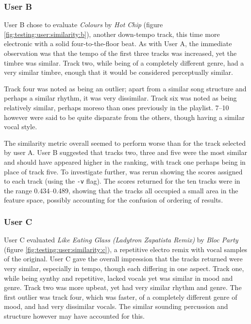 \subsubsection{User B}
User B chose to evaluate \emph{Colours} by \emph{Hot Chip} (figure \ref{fig:testing:user:similarity:b}), another down-tempo track, this time more electronic with a solid four-to-the-floor beat. As with User A, the immediate observation was that the tempo of the first three tracks was increased, yet the timbre was similar. Track two, while being of a completely different genre, had a very similar timbre, enough that it would be considered perceptually similar.


Track four was noted as being an outlier; apart from a similar song structure and perhaps a similar rhythm, it was very dissimilar. Track six was noted as being relatively similar, perhaps moreso than ones previously in the playlist. 7--10 however were said to be quite disparate from the others, though having a similar vocal style.

The similarity metric overall seemed to perform worse than for the track selected by user A. User B suggested that tracks two, three and five were the most similar and should have appeared higher in the ranking, with track one perhaps being in place of track five. To investigate further,  was rerun showing the scores assigned to each track (using the \texttt{-v} flag). The scores returned for the ten tracks were in the range 0.434--0.489, showing that the tracks all occupied a small area in the feature space, possibly accounting for the confusion of ordering of results.
\subsubsection{User C}
User C evaluated \emph{Like Eating Glass (Ladytron Zapatista Remix)} by \emph{Bloc Party} (figure \ref{fig:testing:user:similarity:c}), a repetitive electro remix with vocal samples of the original. User C gave the overall impression that the tracks returned were very similar, especially in tempo, though each differing in one aspect. Track one, while being synthy and repetitive, lacked vocals yet was similar in mood and genre. Track two was more upbeat, yet had very similar rhythm and genre. The first outlier was track four, which was faster, of a completely different genre of mood, and had very dissimilar vocals. The similar sounding percussion and structure however may have accounted for this.

